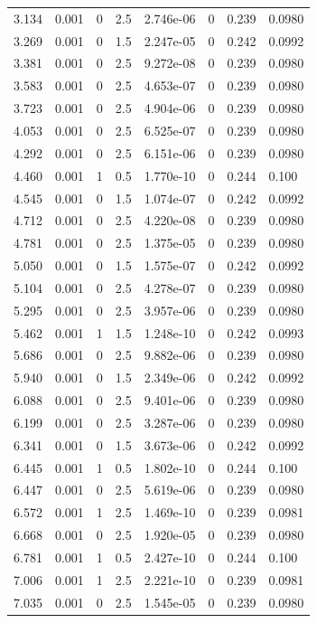 \documentclass[preview]{standalone}
\begin{document}
{{\begin{tabular}{L{1.2cm}C{1.2cm} C{0.3cm}C{0.5cm} C{1.4cm}C{1.4cm} C{1.4cm}C{1.4cm}}
  3.134  &  0.001  & 0     & 2.5 &  2.746e-06  & 0  & 0.239 &  0.0980   \\ 
  3.269  &  0.001  & 0     & 1.5 &  2.247e-05  & 0  & 0.242 &  0.0992   \\ 
  3.381  &  0.001  & 0     & 2.5 &  9.272e-08  & 0  & 0.239 &  0.0980   \\ 
  3.583  &  0.001  & 0     & 2.5 &  4.653e-07  & 0  & 0.239 &  0.0980   \\ 
  3.723  &  0.001  & 0     & 2.5 &  4.904e-06  & 0  & 0.239 &  0.0980   \\ 
  4.053  &  0.001  & 0     & 2.5 &  6.525e-07  & 0  & 0.239 &  0.0980   \\ 
  4.292  &  0.001  & 0     & 2.5 &  6.151e-06  & 0  & 0.239 &  0.0980   \\ 
  4.460  &  0.001  & 1     & 0.5 &  1.770e-10  & 0  & 0.244 &  0.100   \\ 
  4.545  &  0.001  & 0     & 1.5 &  1.074e-07  & 0  & 0.242 &  0.0992   \\ 
  4.712  &  0.001  & 0     & 2.5 &  4.220e-08  & 0  & 0.239 &  0.0980   \\ 
  4.781  &  0.001  & 0     & 2.5 &  1.375e-05  & 0  & 0.239 &  0.0980   \\ 
  5.050  &  0.001  & 0     & 1.5 &  1.575e-07  & 0  & 0.242 &  0.0992   \\ 
  5.104  &  0.001  & 0     & 2.5 &  4.278e-07  & 0  & 0.239 &  0.0980   \\ 
  5.295  &  0.001  & 0     & 2.5 &  3.957e-06  & 0  & 0.239 &  0.0980   \\ 
  5.462  &  0.001  & 1     & 1.5 &  1.248e-10  & 0  & 0.242 &  0.0993   \\ 
  5.686  &  0.001  & 0     & 2.5 &  9.882e-06  & 0  & 0.239 &  0.0980   \\ 
  5.940  &  0.001  & 0     & 1.5 &  2.349e-06  & 0  & 0.242 &  0.0992   \\ 
  6.088  &  0.001  & 0     & 2.5 &  9.401e-06  & 0  & 0.239 &  0.0980   \\ 
  6.199  &  0.001  & 0     & 2.5 &  3.287e-06  & 0  & 0.239 &  0.0980   \\ 
  6.341  &  0.001  & 0     & 1.5 &  3.673e-06  & 0  & 0.242 &  0.0992   \\ 
  6.445  &  0.001  & 1     & 0.5 &  1.802e-10  & 0  & 0.244 &  0.100   \\ 
  6.447  &  0.001  & 0     & 2.5 &  5.619e-06  & 0  & 0.239 &  0.0980   \\ 
  6.572  &  0.001  & 1     & 2.5 &  1.469e-10  & 0  & 0.239 &  0.0981   \\ 
  6.668  &  0.001  & 0     & 2.5 &  1.920e-05  & 0  & 0.239 &  0.0980   \\ 
  6.781  &  0.001  & 1     & 0.5 &  2.427e-10  & 0  & 0.244 &  0.100   \\ 
  7.006  &  0.001  & 1     & 2.5 &  2.221e-10  & 0  & 0.239 &  0.0981   \\ 
  7.035  &  0.001  & 0     & 2.5 &  1.545e-05  & 0  & 0.239 &  0.0980   \\ 
\hline 
\end{tabular} 

}}
\end{document}
